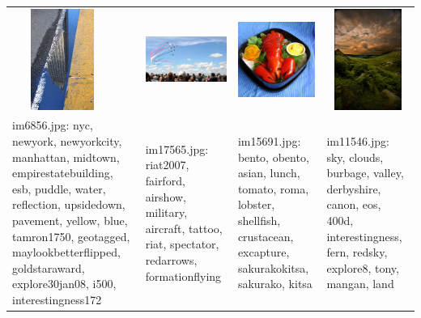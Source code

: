 \begin{tabular}{p{1.3in} p{1.3in} p{1.3in} p{1.3in} }
\includegraphics[keepaspectratio=false, height=1.3in, width=1.3in]{../datasets/mirflickr-test/im6856.jpg} & \includegraphics[keepaspectratio=false, height=1.3in, width=1.3in]{../datasets/mirflickr-training/im17565.jpg} & \includegraphics[keepaspectratio=false, height=1.3in, width=1.3in]{../datasets/mirflickr-training/im15691.jpg} & \includegraphics[keepaspectratio=false, height=1.3in, width=1.3in]{../datasets/mirflickr-training/im11546.jpg}\\
im6856.jpg: nyc, newyork, newyorkcity, manhattan, midtown, empirestatebuilding, esb, puddle, water, reflection, upsidedown, pavement, yellow, blue, tamron1750, geotagged, maylookbetterflipped, goldstaraward, explore30jan08, i500, interestingness172 & im17565.jpg: riat2007, fairford, airshow, military, aircraft, tattoo, riat, spectator, redarrows, formationflying & im15691.jpg: bento, obento, asian, lunch, tomato, roma, lobster, shellfish, crustacean, excapture, sakurakokitsa, sakurako, kitsa & im11546.jpg: sky, clouds, burbage, valley, derbyshire, canon, eos, 400d, interestingness, fern, redsky, explore8, tony, mangan, land\\
\end{tabular}

